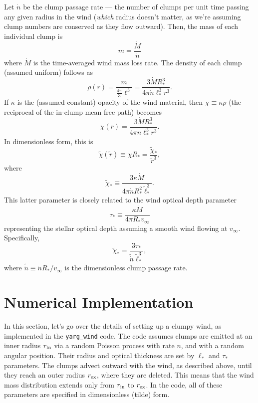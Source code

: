 \documentclass{article}
\newcommand{\vinf}{v_{\infty}}
\newcommand{\Rstar}{R_{\ast}}
\newcommand{\tr}{\tilde{r}}
\newcommand{\tell}{\tilde{\ell}}
\newcommand{\rin}{r_{\rm in}}
\newcommand{\rex}{r_{\rm ex}}
\newcommand{\tchi}{\tilde{\chi}}
\newcommand{\tchistar}{\tilde{\chi}_{\ast}}
\newcommand{\ellstar}{\ell_{\ast}}
\newcommand{\tellstar}{\tell_{\ast}}
\newcommand{\taustar}{\tau_{\ast}}
\begin{document}
Let $\dot{n}$ be the clump passage rate --- the number of clumps per
unit time passing any given radius in the wind (\emph{which} radius
doesn't matter, as we're assuming clump numbers are conserved as they
flow outward). Then, the mass of each individual clump is
%
\begin{equation}
  m = \frac{\dot{M}}{\dot{n}}
\end{equation}
%
where $\dot{M}$ is the time-averaged wind mass loss rate. The density
of each clump (assumed uniform) follows as
%
\begin{equation}
  \rho(r) = \frac{m}{\frac{4\pi}{3} \ell^{3}} =
  \frac{3 \dot{M} \Rstar^{3}}{4\pi \dot{n} \ellstar^{3} r^{3}}.
\end{equation}
%
If $\kappa$ is the (assumed-constant) opacity of the wind material,
then $\chi \equiv \kappa\rho$ (the reciprocal of the in-clump mean
free path) becomes
%
\begin{equation}
  \chi(r) = \frac{3 \dot{M} \Rstar^{3}}{4\pi \dot{n} \ellstar^{3} r^{3}}.
\end{equation}
%
In dimensionless form, this is
%
\begin{equation}
  \tchi(\tr) \equiv \chi \Rstar = \frac{\tchistar}{\tr^{3}},
\end{equation}
%
where
\begin{equation}
  \tchistar \equiv \frac{3 \kappa \dot{M}}{4\pi \dot{n} \Rstar^{2} \tellstar^{3}}.
\end{equation}
%
This latter parameter is closely related to the wind optical depth parameter
%
\begin{equation}
  \taustar \equiv \frac{\kappa \dot{M}}{4 \pi \Rstar \vinf}
\end{equation}
%
representing the stellar optical depth assuming a smooth wind flowing
at $\vinf$. Specifically,
%
\begin{equation}
  \tchistar = \frac{3 \taustar}{\tilde{\dot{n}} \tellstar^{3}},
\end{equation}
%
where $\tilde{\dot{n}} \equiv \dot{n} \Rstar/\vinf$ is the dimensionless clump passage rate.

\section*{Numerical Implementation}

In this section, let's go over the details of setting up a clumpy
wind, as implemented in the \texttt{yarg\_wind} code. The code assumes
clumps are emitted at an inner radius $\rin$ via a random Poisson
process with rate $n$, and with a random angular position. Their
radius and optical thickness are set by $\ellstar$ and $\taustar$
parameters. The clumps advect outward with the wind, as described
above, until they reach an outer radius $\rex$, where they are
deleted. This means that the wind mass distribution extends only from
$\rin$ to $\rex$. In the code, all of these parameters are specified
in dimensionless (tilde) form.
\end{document}

